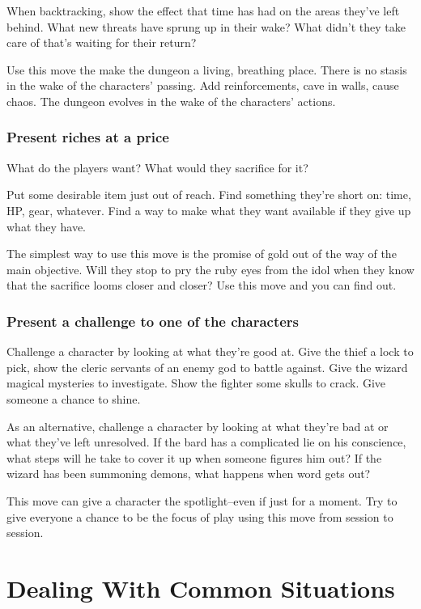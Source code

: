  When backtracking, show the effect that time has had on the areas they've left behind. What new threats have sprung up in their wake? What didn't they take care of that's waiting for their return?


 Use this move the make the dungeon a living, breathing place. There is no stasis in the wake of the characters' passing. Add reinforcements, cave in walls, cause chaos. The dungeon evolves in the wake of the characters' actions.
\subsubsection{Present riches at a price}


 What do the players want? What would they sacrifice for it?


 Put some desirable item just out of reach. Find something they're short on: time, HP, gear, whatever. Find a way to make what they want available if they give up what they have.


 The simplest way to use this move is the promise of gold out of the way of the main objective. Will they stop to pry the ruby eyes from the idol when they know that the sacrifice looms closer and closer? Use this move and you can find out.
\subsubsection{Present a challenge to one of the characters}


 Challenge a character by looking at what they're good at. Give the thief a lock to pick, show the cleric servants of an enemy god to battle against. Give the wizard magical mysteries to investigate. Show the fighter some skulls to crack. Give someone a chance to shine.


 As an alternative, challenge a character by looking at what they're bad at or what they've left unresolved. If the bard has a complicated lie on his conscience, what steps will he take to cover it up when someone figures him out? If the wizard has been summoning demons, what happens when word gets out?


 This move can give a character the spotlight--even if just for a moment. Try to give everyone a chance to be the focus of play using this move from session to session.
\section{Dealing With Common Situations}


